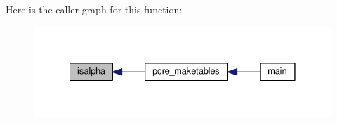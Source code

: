 Here is the caller graph for this function\+:
\nopagebreak
\begin{figure}[H]
\begin{center}
\leavevmode
\includegraphics[width=328pt]{README_8txt_a1a9982a5b5761e5270bf12839e8b1b35_icgraph}
\end{center}
\end{figure}



